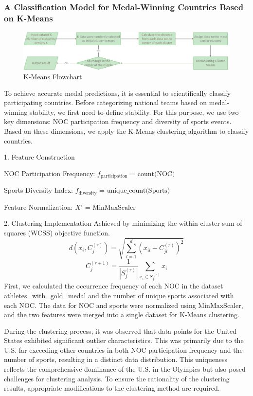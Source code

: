 \documentclass{mcmthesis}
\begin{document}
\subsubsection{A Classification Model for Medal-Winning Countries Based on K-Means}

\begin{figure}[H]
    \centering
    \includegraphics[width=12cm]{graph/K-means.png}
    \caption{K-Means Flowchart} \label{Figure 4}
\end{figure}
To achieve accurate medal predictions, it is essential to scientifically classify participating countries. Before categorizing national teams based on medal-winning stability, we first need to define stability. For this purpose, we use two key dimensions: NOC participation frequency and diversity of sports events. Based on these dimensions, we apply the K-Means clustering algorithm to classify countries.

1.	Feature Construction

\qquad NOC Participation Frequency: $f_{\text{participation}}$ = $\text{count(NOC)}$

\qquad Sports Diversity Index: $f_{\text{diversity}}$ = $\text{unique\_count(Sports)}$

\qquad Feature Normalization: $X'$ = $\text{MinMaxScaler}$

2.	Clustering Implementation
Achieved by minimizing the within-cluster sum of squares (WCSS) objective function.
\begin{equation} \label{}
    d(x_i,C_j^{(r)})=\sqrt{\sum_{l=1}^d(x_{il}-C_{jl}^{(r)})^2}
\end{equation}
\begin{equation}\label{}
    C_j^{(r+1)}=\frac{1}{|S_j^{(r)}|}\sum_{x_i\in S_j^{(r)}}x_i
\end{equation}
First, we calculated the occurrence frequency of each NOC in the dataset athletes\_with\_gold\_medal and the number of unique sports associated with each NOC. The data for NOC and sports were normalized using MinMaxScaler, and the two features were merged into a single dataset for K-Means clustering.

During the clustering process, it was observed that data points for the United States exhibited significant outlier characteristics. This was primarily due to the U.S. far exceeding other countries in both NOC participation frequency and the number of sports, resulting in a distinct data distribution. This uniqueness reflects the comprehensive dominance of the U.S. in the Olympics but also posed challenges for clustering analysis. To ensure the rationality of the clustering results, appropriate modifications to the clustering method are required.
\end{document}
